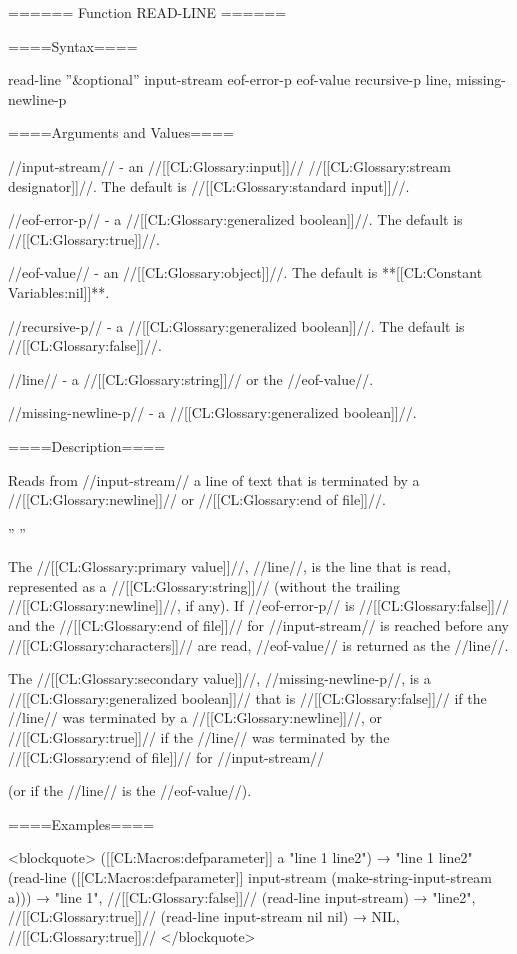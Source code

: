 ====== Function READ-LINE ======

====Syntax====

\DefunWithValuesNewline read-line {''&optional'' input-stream eof-error-p eof-value recursive-p} {line, missing-newline-p}

====Arguments and Values====

//input-stream// - an //[[CL:Glossary:input]]// //[[CL:Glossary:stream designator]]//. The default is //[[CL:Glossary:standard input]]//.

//eof-error-p// - a //[[CL:Glossary:generalized boolean]]//. The default is //[[CL:Glossary:true]]//.

//eof-value// - an //[[CL:Glossary:object]]//. The default is **[[CL:Constant Variables:nil]]**.

//recursive-p// - a //[[CL:Glossary:generalized boolean]]//. The default is //[[CL:Glossary:false]]//.

//line// - a //[[CL:Glossary:string]]// or the //eof-value//.

//missing-newline-p// - a //[[CL:Glossary:generalized boolean]]//.

====Description====

Reads from //input-stream// a line of text that is terminated by a //[[CL:Glossary:newline]]// or //[[CL:Glossary:end of file]]//.

{'' ''}{\ExplainRecursiveP}

The //[[CL:Glossary:primary value]]//, //line//, is the line that is read, represented as a //[[CL:Glossary:string]]// (without the trailing //[[CL:Glossary:newline]]//, if any). If //eof-error-p// is //[[CL:Glossary:false]]// and the //[[CL:Glossary:end of file]]// for //input-stream// is reached before any //[[CL:Glossary:characters]]// are read, //eof-value// is returned as the //line//.

The //[[CL:Glossary:secondary value]]//, //missing-newline-p//, is a //[[CL:Glossary:generalized boolean]]// that is //[[CL:Glossary:false]]// if the //line// was terminated by a //[[CL:Glossary:newline]]//, or //[[CL:Glossary:true]]// if the //line// was terminated by the //[[CL:Glossary:end of file]]// for //input-stream//

(or if the //line// is the //eof-value//).

====Examples====

<blockquote> ([[CL:Macros:defparameter]] a "line 1 line2") → "line 1 line2" (read-line ([[CL:Macros:defparameter]] input-stream (make-string-input-stream a))) → "line 1", //[[CL:Glossary:false]]// (read-line input-stream) → "line2", //[[CL:Glossary:true]]// (read-line input-stream nil nil) → NIL, //[[CL:Glossary:true]]// </blockquote>


